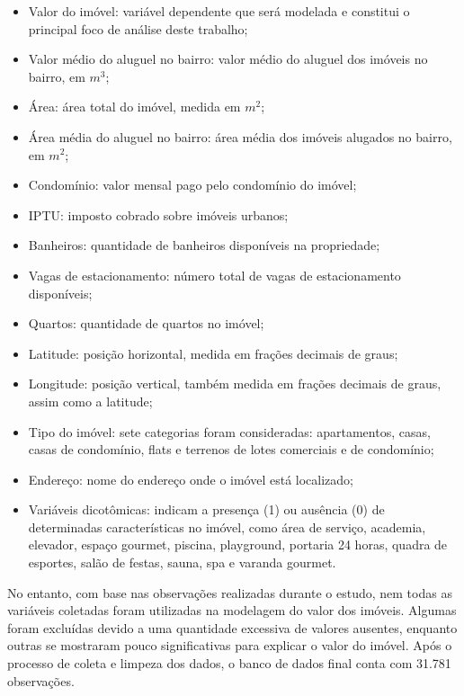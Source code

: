 \documentclass[
  12pt,
  a4paper,
]{scrreprt}
\begin{document}
\begin{itemize}
\item
  Valor do imóvel: variável dependente que será modelada e constitui o
  principal foco de análise deste trabalho;
\item
  Valor médio do aluguel no bairro: valor médio do aluguel dos imóveis
  no bairro, em \(m^3\);
\item
  Área: área total do imóvel, medida em \(m^2\);
\item
  Área média do aluguel no bairro: área média dos imóveis alugados no
  bairro, em \(m^2\);
\item
  Condomínio: valor mensal pago pelo condomínio do imóvel;
\item
  IPTU: imposto cobrado sobre imóveis urbanos;
\item
  Banheiros: quantidade de banheiros disponíveis na propriedade;
\item
  Vagas de estacionamento: número total de vagas de estacionamento
  disponíveis;
\item
  Quartos: quantidade de quartos no imóvel;
\item
  Latitude: posição horizontal, medida em frações decimais de graus;
\item
  Longitude: posição vertical, também medida em frações decimais de
  graus, assim como a latitude;
\item
  Tipo do imóvel: sete categorias foram consideradas: apartamentos,
  casas, casas de condomínio, flats e terrenos de lotes comerciais e de
  condomínio;
\item
  Endereço: nome do endereço onde o imóvel está localizado;
\item
  Variáveis dicotômicas: indicam a presença (1) ou ausência (0) de
  determinadas características no imóvel, como área de serviço,
  academia, elevador, espaço gourmet, piscina, playground, portaria 24
  horas, quadra de esportes, salão de festas, sauna, spa e varanda
  gourmet.
\end{itemize}

\vspace{12pt}

No entanto, com base nas observações realizadas durante o estudo, nem
todas as variáveis coletadas foram utilizadas na modelagem do valor dos
imóveis. Algumas foram excluídas devido a uma quantidade excessiva de
valores ausentes, enquanto outras se mostraram pouco significativas para
explicar o valor do imóvel. Após o processo de coleta e limpeza dos
dados, o banco de dados final conta com 31.781 observações.
\end{document}
